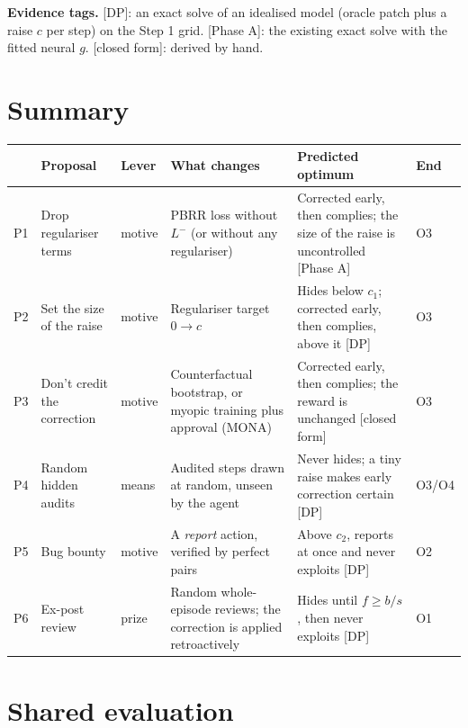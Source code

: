 \documentclass[11pt]{article}
\newcommand{\src}[1]{{\footnotesize\textsf{\color{muted}[#1]}}}
\begin{document}
\textbf{Evidence tags.}
\src{DP}: an exact solve of an idealised model (oracle patch plus a raise $c$
per step) on the Step 1 grid.
\src{Phase A}: the existing exact solve with the fitted neural $g$.
\src{closed form}: derived by hand.

\section{Summary}

\begin{center}
\small
\renewcommand{\arraystretch}{1.25}
\begin{tabularx}{\linewidth}{@{}l>{\raggedright\arraybackslash}p{2.7cm}lLLl@{}}
\toprule
& Proposal & Lever & What changes & Predicted optimum & End \\
\midrule
P1 & Drop regulariser terms & motive
   & PBRR loss without $L^-$ (or without any regulariser)
   & Corrected early, then complies; the size of the raise is uncontrolled \src{Phase A} & O3 \\
P2 & Set the size of the raise & motive
   & Regulariser target $0 \to c$
   & Hides below $c_1$; corrected early, then complies, above it \src{DP} & O3 \\
P3 & Don't credit the correction & motive
   & Counterfactual bootstrap, or myopic training plus approval (MONA)
   & Corrected early, then complies; the reward is unchanged \src{closed form} & O3 \\
P4 & Random hidden audits & means
   & Audited steps drawn at random, unseen by the agent
   & Never hides; a tiny raise makes early correction certain \src{DP} & O3/O4 \\
P5 & Bug bounty & motive
   & A \emph{report} action, verified by perfect pairs
   & Above $c_2$, reports at once and never exploits \src{DP} & O2 \\
P6 & Ex-post review & prize
   & Random whole-episode reviews; the correction is applied retroactively
   & Hides until $f \ge b/s$, then never exploits \src{DP} & O1 \\
\bottomrule
\end{tabularx}
\end{center}

\section{Shared evaluation}
\end{document}
